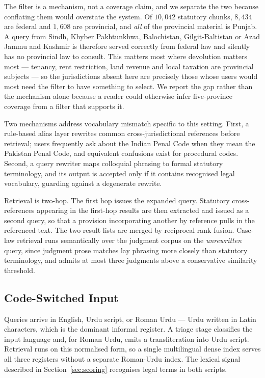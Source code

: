 \documentclass[conference]{IEEEtran}
\begin{document}
The filter is a mechanism, not a coverage claim, and we separate the two because
conflating them would overstate the system. Of $10{,}042$ statutory chunks,
$8{,}434$ are federal and $1{,}608$ are provincial, and \emph{all} of the
provincial material is Punjab. A query from Sindh, Khyber Pakhtunkhwa,
Balochistan, Gilgit-Baltistan or Azad Jammu and Kashmir is therefore served
correctly from federal law and silently has no provincial law to consult. This
matters most where devolution matters most --- tenancy, rent restriction, land
revenue and local taxation are provincial subjects --- so the jurisdictions
absent here are precisely those whose users would most need the filter to have
something to select. We report the gap rather than the mechanism alone because
a reader could otherwise infer five-province coverage from a filter that
supports it.

Two mechanisms address vocabulary mismatch specific to this setting. First, a
rule-based alias layer rewrites common cross-jurisdictional references before
retrieval; users frequently ask about the Indian Penal Code when they mean the
Pakistan Penal Code, and equivalent confusions exist for procedural codes.
Second, a query rewriter maps colloquial phrasing to formal statutory
terminology, and its output is accepted only if it contains recognised legal
vocabulary, guarding against a degenerate rewrite.

Retrieval is two-hop. The first hop issues the expanded query. Statutory
cross-references appearing in the first-hop results are then extracted and
issued as a second query, so that a provision incorporating another by
reference pulls in the referenced text. The two result lists are merged by
reciprocal rank fusion. Case-law retrieval runs semantically over the judgment
corpus on the \emph{unrewritten} query, since judgment prose matches lay
phrasing more closely than statutory terminology, and admits at most three
judgments above a conservative similarity threshold.

\subsection{Code-Switched Input}
Queries arrive in English, Urdu script, or Roman Urdu --- Urdu written in Latin
characters, which is the dominant informal register. A triage stage classifies
the input language and, for Roman Urdu, emits a transliteration into Urdu
script. Retrieval runs on this normalised form, so a single multilingual dense
index serves all three registers without a separate Roman-Urdu index. The
lexical signal described in Section~\ref{sec:scoring} recognises legal terms in
both scripts.
\end{document}

